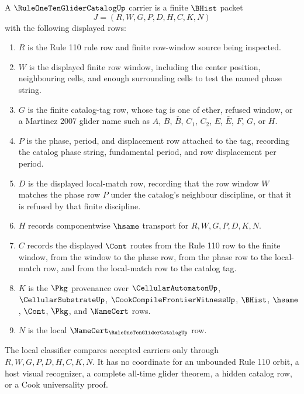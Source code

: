 \begin{definition}
\label{def:rule110-glider-catalog-carrier}
A $\RuleOneTenGliderCatalogUp$ carrier is a finite $\BHist$ packet
$$
J=(R,W,G,P,D,H,C,K,N)
$$
with the following displayed rows:
\begin{enumerate}
\item $R$ is the Rule 110 rule row and finite row-window source being inspected.
\item $W$ is the displayed finite row window, including the center position, neighbouring cells, and enough surrounding cells to test the named phase string.
\item $G$ is the finite catalog-tag row, whose tag is one of ether, refused window, or a Martinez 2007 glider name such as $A$, $B$, $\bar{B}$, $C_1$, $C_2$, $E$, $\bar{E}$, $F$, $G$, or $H$.
\item $P$ is the phase, period, and displacement row attached to the tag, recording the catalog phase string, fundamental period, and row displacement per period.
\item $D$ is the displayed local-match row, recording that the row window $W$ matches the phase row $P$ under the catalog's neighbour discipline, or that it is refused by that finite discipline.
\item $H$ records componentwise $\hsame$ transport for $R,W,G,P,D,K,N$.
\item $C$ records the displayed $\Cont$ routes from the Rule 110 row to the finite window, from the window to the phase row, from the phase row to the local-match row, and from the local-match row to the catalog tag.
\item $K$ is the $\Pkg$ provenance over $\CellularAutomatonUp$, $\CellularSubstrateUp$, $\CookCompileFrontierWitnessUp$, $\BHist$, $\hsame$, $\Cont$, $\Pkg$, and $\NameCert$ rows.
\item $N$ is the local $\NameCert_{\RuleOneTenGliderCatalogUp}$ row.
\end{enumerate}
The local classifier compares accepted carriers only through $R,W,G,P,D,H,C,K,N$. It has no coordinate for an unbounded Rule 110 orbit, a host visual recognizer, a complete all-time glider theorem, a hidden catalog row, or a Cook universality proof.
\end{definition}


